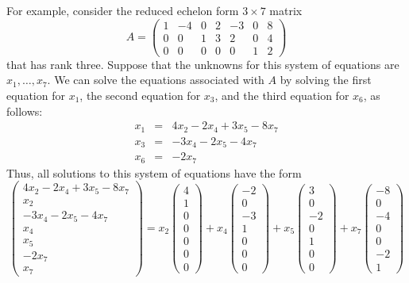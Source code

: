 \documentclass{ximera}
\begin{document}
For example, consider the reduced echelon form $3\times 7$ matrix
\begin{equation}  \label{E:nullityexamp}
A=\left(\begin{array}{rrrrrrr}
1 & -4 & 0 &  2 & -3 & 0 & 8 \\
0 &  0 & 1 &  3 &  2 & 0 & 4 \\
0 &  0 & 0 &  0 &  0 & 1 & 2  \end{array}\right)
\end{equation}
that has rank three. Suppose that the unknowns for this system of
equations are
$x_1,\ldots,x_7$.  We can solve the equations associated with
$A$ by solving the first equation for $x_1$, the second equation
for $x_3$, and the third equation for $x_6$, as follows:
\begin{eqnarray*}
x_1 & = & 4x_2 - 2x_4 + 3x_5 - 8x_7 \\
x_3 & = &      - 3x_4 - 2x_5 - 4x_7 \\
x_6 & = &                    - 2x_7
\end{eqnarray*}
Thus, all solutions to this system of equations have the form
{\small
\begin{equation}   \label{e:expandsoln}
\left(\begin{array}{c} 4x_2 - 2x_4 + 3x_5 - 8x_7 \\ x_2 \\
-3x_4 - 2x_5 - 4x_7 \\ x_4 \\ x_5 \\  - 2x_7 \\ x_7 \end{array} \right)  =
x_2 \left(\begin{array}{r}  4 \\ 1 \\  0 \\ 0 \\ 0 \\  0 \\ 0
\end{array} \right) +
x_4 \left(\begin{array}{r} -2 \\ 0 \\ -3 \\ 1 \\ 0 \\  0 \\ 0
\end{array} \right) +
x_5 \left(\begin{array}{r}  3 \\ 0 \\ -2 \\ 0 \\ 1 \\  0 \\ 0
\end{array} \right) +
x_7 \left(\begin{array}{r} -8 \\ 0 \\ -4 \\ 0 \\ 0 \\ -2 \\ 1
\end{array} \right)
\end{equation} }
\end{document}
